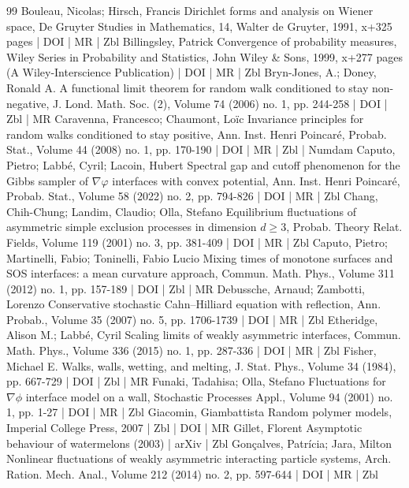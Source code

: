 \begin{thebibliography}{99}
 Bouleau, Nicolas; Hirsch, Francis Dirichlet forms and analysis on Wiener space, De Gruyter Studies in Mathematics, 14, Walter de Gruyter, 1991, x+325 pages | DOI | MR | Zbl
 Billingsley, Patrick Convergence of probability measures, Wiley Series in Probability and Statistics, John Wiley \& Sons, 1999, x+277 pages (A Wiley-Interscience Publication) | DOI | MR | Zbl
 Bryn-Jones, A.; Doney, Ronald A. A functional limit theorem for random walk conditioned to stay non-negative, J. Lond. Math. Soc. (2), Volume 74 (2006) no. 1, pp. 244-258 | DOI | Zbl | MR
 Caravenna, Francesco; Chaumont, Loïc Invariance principles for random walks conditioned to stay positive, Ann. Inst. Henri Poincaré, Probab. Stat., Volume 44 (2008) no. 1, pp. 170-190 | DOI | MR | Zbl | Numdam
 Caputo, Pietro; Labbé, Cyril; Lacoin, Hubert Spectral gap and cutoff phenomenon for the Gibbs sampler of $\nabla \varphi $ interfaces with convex potential, Ann. Inst. Henri Poincaré, Probab. Stat., Volume 58 (2022) no. 2, pp. 794-826 | DOI | MR | Zbl
 Chang, Chih-Chung; Landim, Claudio; Olla, Stefano Equilibrium fluctuations of asymmetric simple exclusion processes in dimension $d\ge 3$, Probab. Theory Relat. Fields, Volume 119 (2001) no. 3, pp. 381-409 | DOI | MR | Zbl
 Caputo, Pietro; Martinelli, Fabio; Toninelli, Fabio Lucio Mixing times of monotone surfaces and SOS interfaces: a mean curvature approach, Commun. Math. Phys., Volume 311 (2012) no. 1, pp. 157-189 | DOI | Zbl | MR
 Debussche, Arnaud; Zambotti, Lorenzo Conservative stochastic Cahn–Hilliard equation with reflection, Ann. Probab., Volume 35 (2007) no. 5, pp. 1706-1739 | DOI | MR | Zbl
 Etheridge, Alison M.; Labbé, Cyril Scaling limits of weakly asymmetric interfaces, Commun. Math. Phys., Volume 336 (2015) no. 1, pp. 287-336 | DOI | MR | Zbl
 Fisher, Michael E. Walks, walls, wetting, and melting, J. Stat. Phys., Volume 34 (1984), pp. 667-729 | DOI | Zbl | MR
 Funaki, Tadahisa; Olla, Stefano Fluctuations for $\nabla \phi $ interface model on a wall, Stochastic Processes Appl., Volume 94 (2001) no. 1, pp. 1-27 | DOI | MR | Zbl
 Giacomin, Giambattista Random polymer models, Imperial College Press, 2007 | Zbl | DOI | MR
 Gillet, Florent Asymptotic behaviour of watermelons (2003) | arXiv | Zbl
 Gonçalves, Patrícia; Jara, Milton Nonlinear fluctuations of weakly asymmetric interacting particle systems, Arch. Ration. Mech. Anal., Volume 212 (2014) no. 2, pp. 597-644 | DOI | MR | Zbl

\end{thebibliography}
